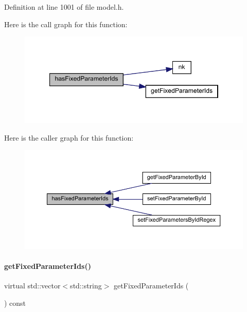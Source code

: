 Definition at line 1001 of file model.\+h.

Here is the call graph for this function\+:
\nopagebreak
\begin{figure}[H]
\begin{center}
\leavevmode
\includegraphics[width=347pt]{classamici_1_1_model_af6cb68d368b1288fa0d7515242bf7a5b_cgraph}
\end{center}
\end{figure}
Here is the caller graph for this function\+:
\nopagebreak
\begin{figure}[H]
\begin{center}
\leavevmode
\includegraphics[width=350pt]{classamici_1_1_model_af6cb68d368b1288fa0d7515242bf7a5b_icgraph}
\end{center}
\end{figure}
\mbox{\label{classamici_1_1_model_a802aef820cb7ddabfb6330abba320bcf}} 
\paragraph{\texorpdfstring{get\+Fixed\+Parameter\+Ids()}{getFixedParameterIds()}}
{\footnotesize\ttfamily virtual std\+::vector$<$std\+::string$>$ get\+Fixed\+Parameter\+Ids (\begin{DoxyParamCaption}{ }\end{DoxyParamCaption}) const\hspace{0.3cm}{\ttfamily [virtual]}}

